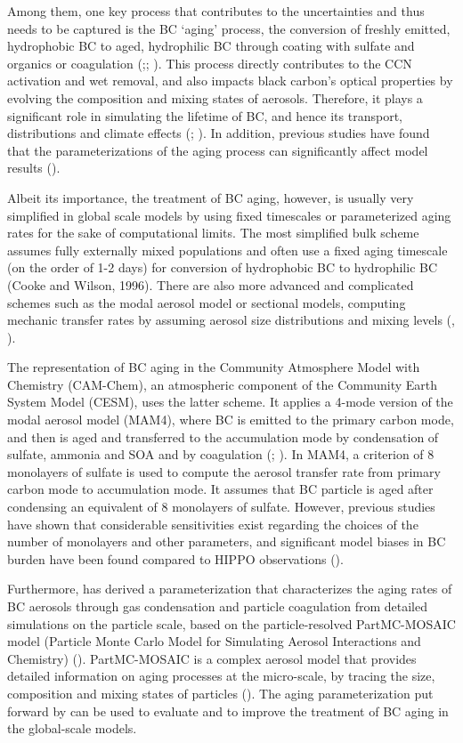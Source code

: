 \documentclass[12pt, fullpage]{uiucthesis2009}
\begin{document}
	Among them, one key process that contributes to the uncertainties and thus needs to be captured is the BC ‘aging’ process, the conversion of freshly emitted, hydrophobic BC to aged, hydrophilic BC through coating with sulfate and organics or coagulation (\cite{langner1992periodicity};\cite{parungo1994aeolian}; \cite{liousse1996global}). This process directly contributes to the CCN activation and wet removal, and also impacts black carbon's optical properties by evolving the composition and mixing states of aerosols. Therefore, it plays a significant role in simulating the lifetime of BC, and hence its transport, distributions and climate effects (\cite{croft2005black}; \cite{riemer2004soot}). In addition, previous studies have found that the parameterizations of the aging process can significantly affect model results (\cite{Liu2010}).
	
	Albeit its importance, the treatment of BC aging, however, is usually very simplified in global scale models by using fixed timescales or parameterized aging rates for the sake of computational limits. The most simplified bulk scheme assumes fully externally mixed populations and often use a fixed aging timescale (on the order of 1-2 days) for conversion of hydrophobic BC to hydrophilic BC (Cooke and Wilson, 1996). There are also more advanced and complicated schemes such as the modal aerosol model or sectional models, computing mechanic transfer rates by assuming aerosol size distributions and mixing levels (\cite{bauer2013historical}, \cite{huang2013enrichment}). 
	
	The representation of BC aging in the Community Atmosphere Model with Chemistry (CAM-Chem), an atmospheric component of the Community Earth System Model (CESM), uses the latter scheme. It applies a 4-mode version of the modal aerosol model (MAM4), where BC is emitted to the primary carbon mode, and then is aged and transferred to the accumulation mode by condensation of sulfate, ammonia and SOA and by coagulation (\cite{Liu2012}; \cite{Lamarque2012}). In MAM4, a criterion of 8 monolayers of sulfate is used to compute the aerosol transfer rate from primary carbon mode to accumulation mode. It assumes that BC particle is aged after condensing an equivalent of 8 monolayers of sulfate. However, previous studies have shown that considerable sensitivities exist regarding the choices of the number of monolayers and other parameters, and significant model biases in BC burden have been found compared to HIPPO observations (\cite{Liu2010}). 
	
	Furthermore, \cite{Fierce2016} has derived a parameterization that characterizes the aging rates of BC aerosols through gas condensation and particle coagulation from detailed simulations on the particle scale, based on the particle-resolved PartMC-MOSAIC model (Particle Monte Carlo Model for Simulating Aerosol Interactions and Chemistry) (\cite{Fierce2016}). PartMC-MOSAIC is a complex aerosol model that provides detailed information on aging processes at the micro-scale, by tracing the size, composition and mixing states of particles (\cite{riemer2010introducing}). The aging parameterization put forward by \cite{Fierce2016} can be used to evaluate and to improve the treatment of BC aging in the global-scale models. 
	
\end{document}
